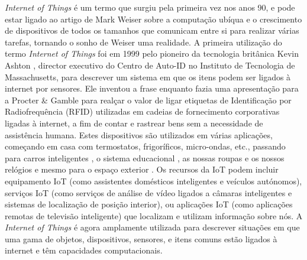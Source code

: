 \documentclass[conference]{IEEEtran}
\begin{document}

\textit{Internet of Things} é um termo que surgiu pela primeira vez nos anos
90, e pode estar ligado ao artigo de Mark Weiser sobre a computação ubíqua
\cite{weiser1991computer} e o crescimento de dispositivos de todos os tamanhos
que comunicam entre si para realizar várias tarefas, tornando o sonho de
Weiser uma realidade. A primeira utilização do termo \textit{Internet of
Things} foi em 1999 pelo pioneiro da tecnologia britânica Kevin Ashton \cite{KevinThat},
director executivo do Centro de Auto-ID no Instituto de Tecnologia de Massachusetts,
para descrever um sistema em que os itens podem ser ligados à internet por
sensores. Ele inventou a frase enquanto fazia uma apresentação para a Procter
\& Gamble para realçar o valor de ligar etiquetas de Identificação por Radiofrequência
(RFID) utilizadas em cadeias de fornecimento corporativas ligadas à internet,
a fim de contar e rastrear bens sem a necessidade de assistência humana.
Estes dispositivos são utilizados em várias aplicações, começando em casa
\cite{marikyan2019systematic} com termostatos, frigoríficos, micro-ondas,
etc., passando para carros inteligentes \cite{arena2020overview}, o sistema
educacional \cite{al2020survey}, as nossas roupas e os nossos relógios \cite{niknejad2020comprehensive}
e mesmo para o espaço exterior \cite{AkyildizInternet}. Os recursos da IoT
podem incluir equipamento IoT (como assistentes domésticos inteligentes e
veículos autónomos), serviços IoT (como serviços de análise de vídeo ligados
a câmaras inteligentes e sistemas de localização de posição interior), ou
aplicações IoT (como aplicações remotas de televisão inteligente) que localizam
e utilizam informação sobre nós. A \textit{Internet of Things} é agora amplamente
utilizada para descrever situações em que uma gama de objetos, dispositivos,
sensores, e itens comuns estão ligados à internet e têm capacidades computacionais.
\end{document}
